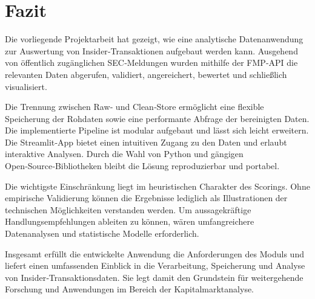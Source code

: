 \section{Fazit}
\label{sec:fazit}

Die vorliegende Projektarbeit hat gezeigt, wie eine analytische Datenanwendung zur Auswertung von Insider‑Transaktionen aufgebaut werden kann. Ausgehend von öffentlich zugänglichen SEC‑Meldungen wurden mithilfe der FMP‑API die relevanten Daten abgerufen, validiert, angereichert, bewertet und schließlich visualisiert.

Die Trennung zwischen Raw‑ und Clean‑Store ermöglicht eine flexible Speicherung der Rohdaten sowie eine performante Abfrage der bereinigten Daten. Die implementierte Pipeline ist modular aufgebaut und lässt sich leicht erweitern. Die Streamlit‑App bietet einen intuitiven Zugang zu den Daten und erlaubt interaktive Analysen. Durch die Wahl von Python und gängigen Open‑Source‑Bibliotheken bleibt die Lösung reproduzierbar und portabel.

Die wichtigste Einschränkung liegt im heuristischen Charakter des Scorings. Ohne empirische Validierung können die Ergebnisse lediglich als Illustrationen der technischen Möglichkeiten verstanden werden. Um aussagekräftige Handlungsempfehlungen ableiten zu können, wären umfangreichere Datenanalysen und statistische Modelle erforderlich.

Insgesamt erfüllt die entwickelte Anwendung die Anforderungen des Moduls und liefert einen umfassenden Einblick in die Verarbeitung, Speicherung und Analyse von Insider‑Transaktionsdaten. Sie legt damit den Grundstein für weitergehende Forschung und Anwendungen im Bereich der Kapitalmarktanalyse.